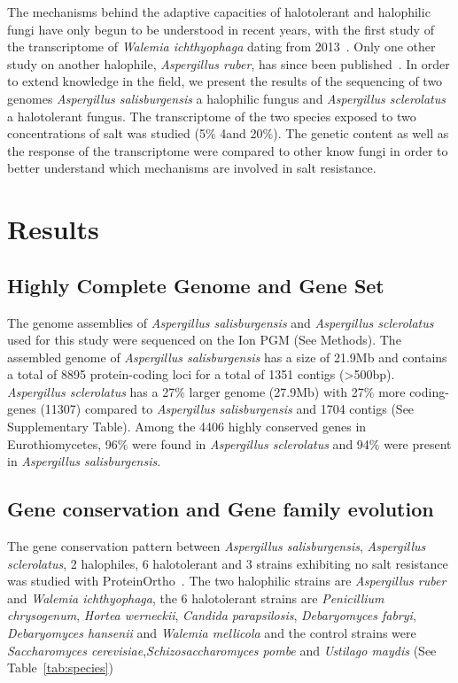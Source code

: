 \documentclass[jof,article,submit,moreauthors,pdftex,10pt,a4paper]{Definitions/mdpi}
\newcommand{\TODO}[1]{\textbf{\color{red}{#1}}}
\newcommand{\horWer}{\textit{Hortea werneckii}}
\newcommand{\aspRub}{\textit{Aspergillus ruber}}
\newcommand{\penChr}{\textit{Penicillium chrysogenum}}
\newcommand{\debFab}{\textit{Debaryomyces fabryi}}
\newcommand{\debHan}{\textit{Debaryomyces hansenii}}
\newcommand{\walIch}{\textit{Walemia ichthyophaga}}
\newcommand{\walMel}{\textit{Walemia mellicola}}
\newcommand{\canPar}{\textit{Candida parapsilosis}}
\newcommand{\sacCer}{\textit{Saccharomyces cerevisiae}}
\newcommand{\schPom}{\textit{Schizosaccharomyces pombe}}
\newcommand{\phiSp}{\textit{Aspergillus salisburgensis}}
\newcommand{\phiScl}{\textit{Aspergillus sclerolatus}}
\newcommand{\ustMay}{\textit{Ustilago maydis}}
\begin{document}
The mechanisms behind the adaptive capacities of halotolerant and halophilic fungi have only begun to be understood in recent years, with the first study of the transcriptome of \walIch{} dating from 2013~\cite{Zajc2013}. Only one other study on another halophile, \aspRub{}, has since been published~\cite{Kis-Papo2014-dn}. In order to extend knowledge in the field, we present the results of the sequencing of two genomes \phiSp{} a halophilic fungus and \phiScl{} a halotolerant fungus. The transcriptome of the two species exposed to two concentrations of salt was studied (5$\%$ 4and 20$\%$).  The genetic content as well as the response of the transcriptome were compared  to other know fungi in order to better understand which mechanisms are involved in salt resistance.\TODO{ADD HAUCH OF RESULTS}




\section{Results}
\subsection{Highly Complete Genome and Gene Set}
The genome assemblies of {\phiSp} and {\phiScl} used for this study
were sequenced on the Ion PGM (See Methods). The assembled genome of {\phiSp} has a size of 21.9Mb and contains a total of 8895 protein-coding loci for a total of 1351 contigs (>500bp). 
{\phiScl} has a 27$\%$ larger genome (27.9Mb) with 27$\%$ more
coding-genes (11307) compared to {\phiSp} and 1704 contigs (See Supplementary Table).
Among the 4406 highly conserved genes in Eurothiomycetes, 96$\%$ were found in \phiScl{} and 94$\%$ were present in \phiSp{}.   
\subsection{Gene conservation and Gene family evolution}
The gene conservation pattern between \phiSp{}, \phiScl{}, 2 halophiles, 6 halotolerant and 3 strains exhibiting no salt resistance was studied with ProteinOrtho~\cite{Lechner2011}. The two halophilic strains are \aspRub{} and \walIch{}, the 6 halotolerant strains are \penChr{}, \horWer{}, \canPar{}, \debFab{}, \debHan{} and \walMel{}  and the control strains were \sacCer{},\schPom{} and \ustMay{} (See Table~\ref{tab:species})
\end{document}

